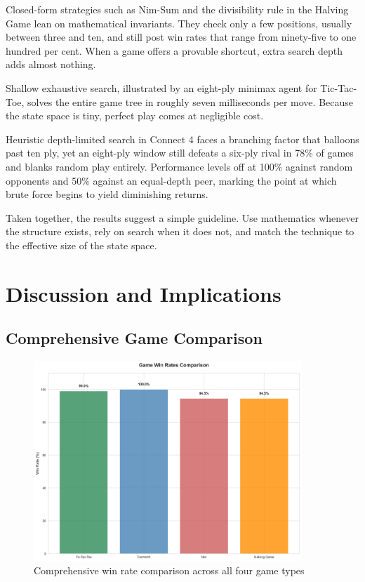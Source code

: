 \documentclass[12pt]{article}
\begin{document}
Closed-form strategies such as Nim-Sum and the divisibility rule in the Halving Game lean on mathematical invariants. They check only a few positions, usually between three and ten, and still post win rates that range from ninety-five to one hundred per cent. When a game offers a provable shortcut, extra search depth adds almost nothing.

Shallow exhaustive search, illustrated by an eight-ply minimax agent for Tic-Tac-Toe, solves the entire game tree in roughly seven milliseconds per move. Because the state space is tiny, perfect play comes at negligible cost.

Heuristic depth-limited search in Connect 4 faces a branching factor that balloons past ten ply, yet an eight-ply window still defeats a six-ply rival in 78\% of games and blanks random play entirely. Performance levels off at 100\% against random opponents and 50\% against an equal-depth peer, marking the point at which brute force begins to yield diminishing returns.

Taken together, the results suggest a simple guideline. Use mathematics whenever the structure exists, rely on search when it does not, and match the technique to the effective size of the state space.

\section{Discussion and Implications}

\subsection{Comprehensive Game Comparison}

\begin{figure}[H]
\centering
\includegraphics[width=0.9\textwidth]{output/images/game_win_rates_comparison.png}
\caption{Comprehensive win rate comparison across all four game types}
\label{fig:game_comparison}
\end{figure}
\end{document}
